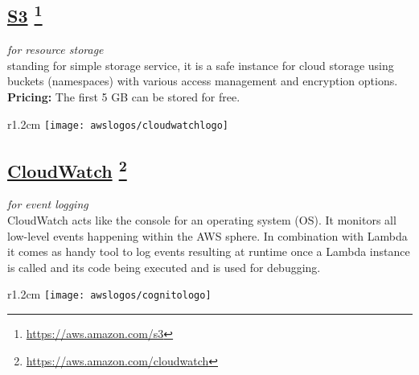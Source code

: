 \subsection*{
\href{https://aws.amazon.com/s3/}{\textbf{S3}} \footnote{\url{https://aws.amazon.com/s3}}
}
\textit{for resource storage}\\
standing for simple storage service, it is a safe instance for cloud storage using buckets (namespaces) with various access management and encryption options. \\ \textbf{Pricing:} The first 5 GB can be stored for free.



\begin{wrapfigure}[2]{r}{1.2cm}
	\texttt{[image: awslogos/cloudwatchlogo]}
\end{wrapfigure}

%

	
	\subsection*{
		\href{https://aws.amazon.com/iam/}{\textbf{CloudWatch}} \footnote{\url{https://aws.amazon.com/cloudwatch}}
	}
	\textit{for event logging}\\
	CloudWatch acts like the console for an operating system (OS). It monitors all low-level events happening within the AWS sphere. In combination with Lambda it comes as handy tool to log events resulting at runtime once a Lambda instance is called and its code being executed and is used for debugging.
	
	
\begin{wrapfigure}[2]{r}{1.2cm}
	\texttt{[image: awslogos/cognitologo]}
\end{wrapfigure}


